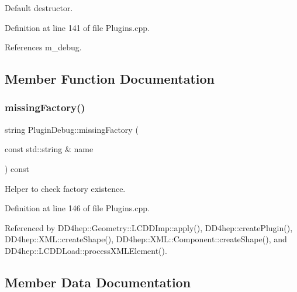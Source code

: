 Default destructor. 



Definition at line 141 of file Plugins.\+cpp.



References m\+\_\+debug.



\subsection{Member Function Documentation}
\hypertarget{struct_d_d4hep_1_1_plugin_debug_a443212c4151ab1c97fde34a92440bbde}{}\label{struct_d_d4hep_1_1_plugin_debug_a443212c4151ab1c97fde34a92440bbde} 
\subsubsection{\texorpdfstring{missing\+Factory()}{missingFactory()}}
{\footnotesize\ttfamily string Plugin\+Debug\+::missing\+Factory (\begin{DoxyParamCaption}\item[{const std\+::string \&}]{name }\end{DoxyParamCaption}) const}



Helper to check factory existence. 



Definition at line 146 of file Plugins.\+cpp.



Referenced by D\+D4hep\+::\+Geometry\+::\+L\+C\+D\+D\+Imp\+::apply(), D\+D4hep\+::create\+Plugin(), D\+D4hep\+::\+X\+M\+L\+::create\+Shape(), D\+D4hep\+::\+X\+M\+L\+::\+Component\+::create\+Shape(), and D\+D4hep\+::\+L\+C\+D\+D\+Load\+::process\+X\+M\+L\+Element().



\subsection{Member Data Documentation}
\hypertarget{struct_d_d4hep_1_1_plugin_debug_afb83475b5c5eb7cb5410b94972627a20}{}\label{struct_d_d4hep_1_1_plugin_debug_afb83475b5c5eb7cb5410b94972627a20} 
